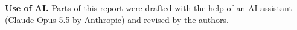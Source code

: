 \vspace{0.6em}
{\footnotesize\noindent\textbf{Use of AI.} Parts of this report were drafted with the help of an AI assistant (Claude Opus 5.5 by Anthropic) and revised by the authors.\par}
